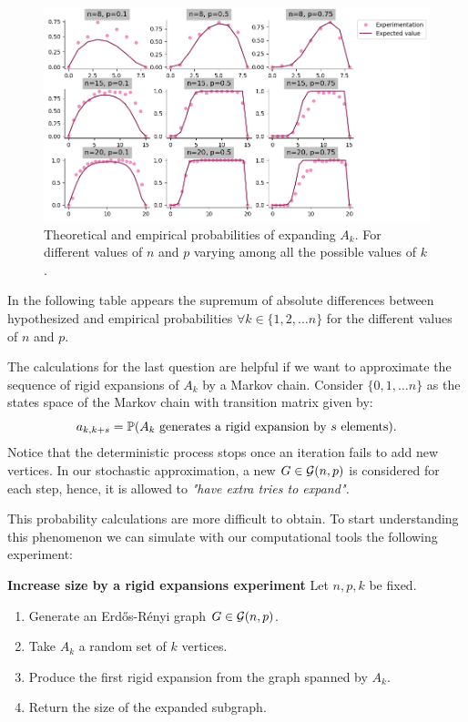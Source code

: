 \begin{figure}[h!]\label{figureExp3}
	\centering
	\includegraphics[scale=0.55]{Python/Figures/Expansion-probability.png}
	\caption{Theoretical and empirical probabilities of expanding $A_{k}$. For different values of $n$ and $p$ varying among all the possible values of $k$.}
\end{figure}

In the following table appears the supremum of absolute differences between hypothesized and empirical probabilities $\forall k \in \{1,2, \dots n\}$ for the different values of $n$ and $p$.

\vspace{0.3cm}

\vspace{-0.3cm}

The calculations for the last question are helpful if we want to approximate the sequence of rigid expansions of $A_{k}$ by a Markov chain. Consider $\{0,1, \dots n\}$ as the states space of the Markov chain with transition matrix given by:
$$ a_{k,k+s} = \P(A_{k} \text{ generates a rigid expansion by } s \text{ elements}).$$
Notice that the deterministic process stops once an iteration fails to add new vertices. In our stochastic approximation, a new $G \in \G(n,p)$ is considered for each step, hence, it is allowed to \textit{"have extra tries to expand".}

This probability calculations are more difficult to obtain. To start understanding this phenomenon we can simulate with our computational tools the following experiment:
 
\begin{cajita}
\textbf{Increase size by a rigid expansions experiment} \hfill \break
Let $n,p,k$ be fixed.
\begin{enumerate}
\item Generate an Erdős-Rényi graph $G\in \G(n,p)$.
\item Take $A_{k}$ a random set of $k$ vertices.
\item Produce the first rigid expansion from the graph spanned by $A_{k}$.
\item Return the size of the expanded subgraph.
\end{enumerate}
\end{cajita}

